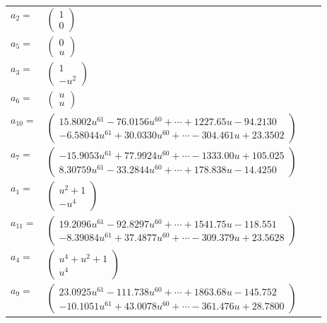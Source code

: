 \documentclass[1p]{elsarticle_modified}
\theoremstyle{definition}
\begin{document}
\begin{tabular}{m{7pt} m{180pt} m{7pt} m{180pt} }
\flushright $a_{2}=$&$\begin{pmatrix}1\\0\end{pmatrix}$ \\
\flushright $a_{5}=$&$\begin{pmatrix}0\\u\end{pmatrix}$ \\
\flushright $a_{3}=$&$\begin{pmatrix}1\\- u^2\end{pmatrix}$ \\
\flushright $a_{6}=$&$\begin{pmatrix}u\\u\end{pmatrix}$ \\
\flushright $a_{10}=$&$\begin{pmatrix}15.8002 u^{61}-76.0156 u^{60}+\cdots+1227.65 u-94.2130\\-6.58044 u^{61}+30.0330 u^{60}+\cdots-304.461 u+23.3502\end{pmatrix}$ \\
\flushright $a_{7}=$&$\begin{pmatrix}-15.9053 u^{61}+77.9924 u^{60}+\cdots-1333.00 u+105.025\\8.30759 u^{61}-33.2844 u^{60}+\cdots+178.838 u-14.4250\end{pmatrix}$ \\
\flushright $a_{1}=$&$\begin{pmatrix}u^2+1\\- u^4\end{pmatrix}$ \\
\flushright $a_{11}=$&$\begin{pmatrix}19.2096 u^{61}-92.8297 u^{60}+\cdots+1541.75 u-118.551\\-8.39084 u^{61}+37.4877 u^{60}+\cdots-309.379 u+23.5628\end{pmatrix}$ \\
\flushright $a_{4}=$&$\begin{pmatrix}u^4+u^2+1\\u^4\end{pmatrix}$ \\
\flushright $a_{9}=$&$\begin{pmatrix}23.0925 u^{61}-111.738 u^{60}+\cdots+1863.68 u-145.752\\-10.1051 u^{61}+43.0078 u^{60}+\cdots-361.476 u+28.7800\end{pmatrix}$ \\

\end{tabular}
\end{document}
